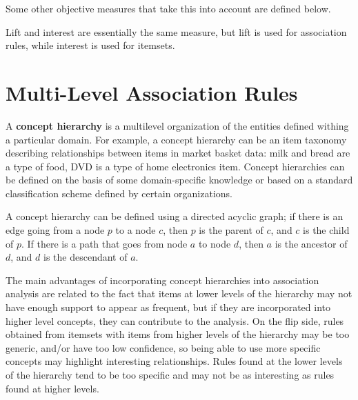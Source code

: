 Some other objective measures that take this into account are defined below.

Lift and interest are essentially the same measure, but lift is used for association rules, while interest is used for itemsets.



\section{Multi-Level Association Rules}

A \textbf{concept hierarchy} is a multilevel organization of the entities defined withing a particular domain. For example, a concept hierarchy can be an item taxonomy describing relationships between items in market basket data: milk and bread are a type of food, DVD is a type of home electronics item. Concept hierarchies can be defined on the basis of some domain-specific knowledge or based on a standard classification scheme defined by certain organizations.

A concept hierarchy can be defined using a directed acyclic graph; if there is an edge going from a node $p$ to a node $c$, then $p$ is the parent of $c$, and $c$ is the child of $p$. If there is a path that goes from node $a$ to node $d$, then $a$ is the ancestor of $d$, and $d$ is the descendant of $a$.

The main advantages of incorporating concept hierarchies into association analysis are related to the fact that items at lower levels of the hierarchy may not have enough support to appear as frequent, but if they are incorporated into higher level concepts, they can contribute to the analysis. On the flip side, rules obtained from itemsets with items from higher levels of the hierarchy may be too generic, and/or have too low confidence, so being able to use more specific concepts may highlight interesting relationships. Rules found at the lower levels of the hierarchy tend to be too specific and may not be as interesting as rules found at higher levels.

